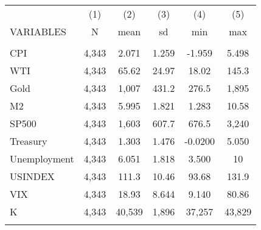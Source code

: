 \documentclass[]{article}
\begin{document}
\begin{tabular}{lccccc} \hline
 & (1) & (2) & (3) & (4) & (5) \\
VARIABLES & N & mean & sd & min & max \\ \hline
 &  &  &  &  &  \\
CPI & 4,343 & 2.071 & 1.259 & -1.959 & 5.498 \\
WTI & 4,343 & 65.62 & 24.97 & 18.02 & 145.3 \\
Gold & 4,343 & 1,007 & 431.2 & 276.5 & 1,895 \\
M2 & 4,343 & 5.995 & 1.821 & 1.283 & 10.58 \\
SP500 & 4,343 & 1,603 & 607.7 & 676.5 & 3,240 \\
Treasury & 4,343 & 1.303 & 1.476 & -0.0200 & 5.050 \\
Unemployment & 4,343 & 6.051 & 1.818 & 3.500 & 10 \\
USINDEX & 4,343 & 111.3 & 10.46 & 93.68 & 131.9 \\
VIX & 4,343 & 18.93 & 8.644 & 9.140 & 80.86 \\
K & 4,343 & 40,539 & 1,896 & 37,257 & 43,829 \\
 &  &  &  &  &  \\ \hline
\end{tabular}
\end{document}
